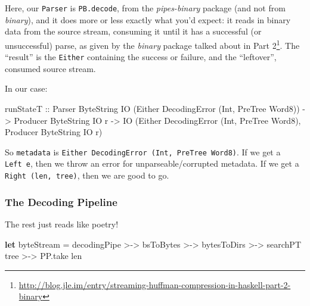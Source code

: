 \documentclass[]{article}
\newenvironment{Shaded}{\begin{snugshade}}{\end{snugshade}}
\newcommand{\DataTypeTok}[1]{\textcolor[rgb]{0.13,0.29,0.53}{#1}}
\newcommand{\FunctionTok}[1]{\textcolor[rgb]{0.00,0.00,0.00}{#1}}
\newcommand{\KeywordTok}[1]{\textcolor[rgb]{0.13,0.29,0.53}{\textbf{#1}}}
\newcommand{\NormalTok}[1]{#1}
\newcommand{\OtherTok}[1]{\textcolor[rgb]{0.56,0.35,0.01}{#1}}
\renewcommand{\href}[2]{#2\footnote{\url{#1}}}
\begin{document}
Here, our \texttt{Parser} is \texttt{PB.decode}, from the \emph{pipes-binary}
package (and not from \emph{binary}), and it does more or less exactly what
you'd expect: it reads in binary data from the source stream, consuming it until
it has a successful (or unsuccessful) parse, as given by the \emph{binary}
package talked about in
\href{http://blog.jle.im/entry/streaming-huffman-compression-in-haskell-part-2-binary}{Part
2}. The ``result'' is the \texttt{Either} containing the success or failure, and
the ``leftover'', consumed source stream.

In our case:

\begin{Shaded}
\begin{Highlighting}[]
\NormalTok{runStateT}
\OtherTok{  ::} \DataTypeTok{Parser}   \DataTypeTok{ByteString} \DataTypeTok{IO}\NormalTok{ (}\DataTypeTok{Either} \DataTypeTok{DecodingError}\NormalTok{ (}\DataTypeTok{Int}\NormalTok{, }\DataTypeTok{PreTree} \DataTypeTok{Word8}\NormalTok{))}
  \OtherTok{->} \DataTypeTok{Producer} \DataTypeTok{ByteString} \DataTypeTok{IO}\NormalTok{ r}
  \OtherTok{->} \DataTypeTok{IO}\NormalTok{ (}\DataTypeTok{Either} \DataTypeTok{DecodingError}\NormalTok{ (}\DataTypeTok{Int}\NormalTok{, }\DataTypeTok{PreTree} \DataTypeTok{Word8}\NormalTok{), }\DataTypeTok{Producer} \DataTypeTok{ByteString} \DataTypeTok{IO}\NormalTok{ r)}
\end{Highlighting}
\end{Shaded}

So \texttt{metadata} is \texttt{Either\ DecodingError\ (Int,\ PreTree\ Word8)}.
If we get a \texttt{Left\ e}, then we throw an error for unparseable/corrupted
metadata. If we get a \texttt{Right\ (len,\ tree)}, then we are good to go.

\hypertarget{the-decoding-pipeline}{%
\subsubsection{The Decoding Pipeline}\label{the-decoding-pipeline}}

The rest just reads like poetry!

\begin{Shaded}
\begin{Highlighting}[]
\KeywordTok{let}\NormalTok{ byteStream }\FunctionTok{=}\NormalTok{ decodingPipe }\FunctionTok{>->}\NormalTok{ bsToBytes}
             \FunctionTok{>->}\NormalTok{ bytesToDirs  }\FunctionTok{>->}\NormalTok{ searchPT tree}
             \FunctionTok{>->}\NormalTok{ PP.take len}
\end{Highlighting}
\end{Shaded}
\end{document}

